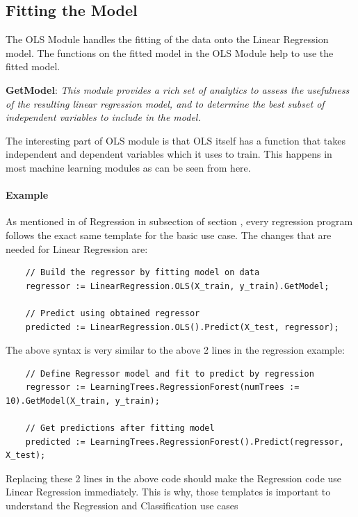 \documentclass[a4paper,oneside,12pt]{book}
\begin{document}
\subsection{Fitting the Model}

The OLS Module handles the fitting of the data onto the Linear Regression model. The functions on the fitted model in the OLS Module help to use the fitted model. 

\textbf{GetModel}: \textit{This module provides a rich set of analytics to assess the usefulness of the resulting linear regression model, and to determine the best subset of independent variables to include in the model.}

The interesting part of OLS module is that OLS itself has a function that takes independent and dependent variables which it uses to train. This happens in most machine learning modules as can be seen from here.

\paragraph{Example}

As mentioned in  of Regression in  subsection of section , every regression program follows the exact same template for the basic use case. The changes that are needed for Linear Regression are:

\begin{lstlisting}
    // Build the regressor by fitting model on data
    regressor := LinearRegression.OLS(X_train, y_train).GetModel;
    
    // Predict using obtained regressor
    predicted := LinearRegression.OLS().Predict(X_test, regressor);
\end{lstlisting}

The above syntax is very similar to the above 2 lines in the regression example:

\begin{lstlisting}
    // Define Regressor model and fit to predict by regression
    regressor := LearningTrees.RegressionForest(numTrees := 10).GetModel(X_train, y_train);

    // Get predictions after fitting model
    predicted := LearningTrees.RegressionForest().Predict(regressor, X_test);
\end{lstlisting}

Replacing these 2 lines in the above code should make the Regression code use Linear Regression immediately. This is why, those templates is important to understand the Regression and Classification use cases
\end{document}
